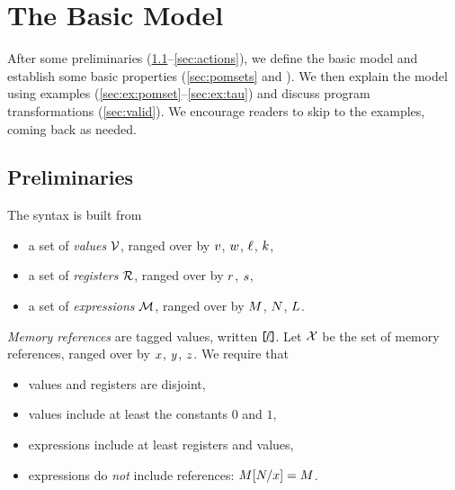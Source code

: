 \section{The Basic Model}
\label{sec:model}

After some preliminaries (\textsection\ref{sec:prelim}--\ref{sec:actions}),
we define the basic model and establish some basic properties
(\textsection\ref{sec:pomsets} and ).  We then explain the
model using examples (\textsection\ref{sec:ex:pomset}--\ref{sec:ex:tau}) and
discuss program transformations (\textsection\ref{sec:valid}).  We encourage
readers to skip to the examples, coming back as needed.




\subsection{Preliminaries}
\label{sec:prelim}
The syntax is built from
\begin{itemize}
\item a set of \emph{values} $\mathcal{V}$, ranged over by
  $v$, $w$, $\ell$, $k$,
\item a set of \emph{registers} $\mathcal{R}$, ranged over by
  $r$, $s$,
\item a set of \emph{expressions} $\mathcal{M}$, ranged over by
  $M$, $N$,  $L$.
\end{itemize}

\emph{Memory references} are tagged values, written $\mkern-2mu\texttt{[}\mkern-2mu\ell \mkern-2mu\texttt{]}\mkern-2mu$.  Let $\mathcal{X}$
be the set of memory references, ranged over by $x$, $y$, $z$.
%
We require that
\begin{itemize}
\item values and registers are disjoint, 
\item values include at least the constants $0$ and $1$,  
\item expressions include at least registers and values, 
\item expressions do \emph{not} include references: $M[N/x]=M$.
\end{itemize}

